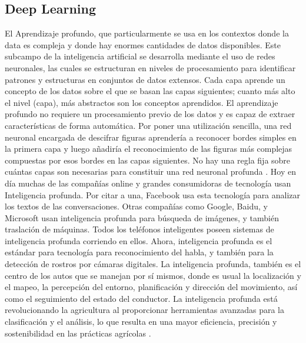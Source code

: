  \subsection{Deep Learning}
 El Aprendizaje profundo, que particularmente se usa en los contextos donde la data es compleja y donde hay enormes cantidades de datos disponibles. Este subcampo de la inteligencia artificial se desarrolla mediante el uso de redes neuronales, las cuales se estructuran en niveles de procesamiento para identificar patrones y estructuras en conjuntos de datos extensos. Cada capa aprende un concepto de los datos sobre el que se basan las capas siguientes; cuanto más alto el nivel (capa), más abstractos son los conceptos aprendidos. El aprendizaje profundo no requiere un procesamiento previo de los datos y es capaz de extraer características de forma automática. Por poner una utilización sencilla, una red neuronal encargada de descifrar figuras aprendería a reconocer bordes simples en la primera capa y luego añadiría el reconocimiento de las figuras más complejas compuestas por esos bordes en las capas siguientes. No hay una regla fija sobre cuántas capas son necesarias para constituir una red neuronal profunda \parencites{rusk2016deep}{rouhiainen2018inteligencia}.
 Hoy en día muchas de las compañías online y grandes consumidoras de tecnología usan Inteligencia profunda. Por citar a una, Facebook usa esta tecnología para analizar los textos de las conversaciones. Otras compañías como Google, Baidu, y Microsoft usan inteligencia profunda para búsqueda de imágenes, y también traslación de máquinas. Todos los teléfonos inteligentes poseen sistemas de inteligencia profunda corriendo en ellos. Ahora, inteligencia profunda es el estándar para tecnología para reconocimiento del habla, y también para la detección de rostros por cámaras digitales. La inteligencia profunda, también es el centro de los autos que se manejan por sí mismos, donde es usual la localización y el mapeo, la percepción del entorno, planificación y dirección del movimiento, así como el seguimiento del estado del conductor. La inteligencia profunda está revolucionando la agricultura al proporcionar herramientas avanzadas para la clasificación y el análisis, lo que resulta en una mayor eficiencia, precisión y sostenibilidad en las prácticas agrícolas \parencite{kelleher2019deep}.
 
